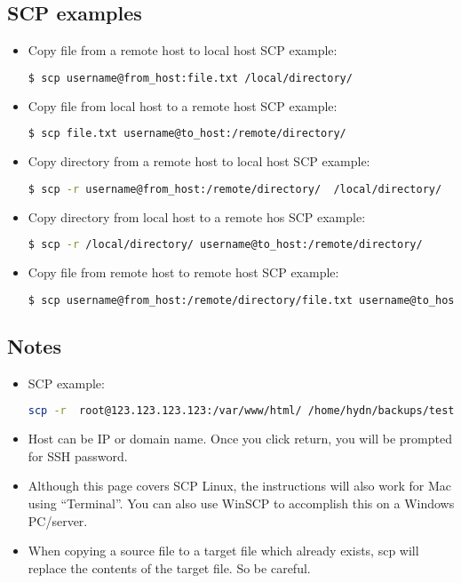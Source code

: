 \subsection{SCP examples} 
\begin{itemize}
\item Copy file from a remote host to local host SCP example:
\begin{lstlisting}[language=bash,numbers=none] 
$ scp username@from_host:file.txt /local/directory/
\end{lstlisting}
\item Copy file from local host to a remote host SCP example:
\begin{lstlisting}[language=bash,numbers=none] 
$ scp file.txt username@to_host:/remote/directory/
\end{lstlisting} 
\item Copy directory from a remote host to local host SCP example:
\begin{lstlisting}[language=bash,numbers=none] 
$ scp -r username@from_host:/remote/directory/  /local/directory/
\end{lstlisting}
\item Copy directory from local host to a remote hos SCP example:
\begin{lstlisting}[language=bash,numbers=none] 
$ scp -r /local/directory/ username@to_host:/remote/directory/
\end{lstlisting} 
\item Copy file from remote host to remote host SCP example:
\begin{lstlisting}[language=bash,numbers=none] 
$ scp username@from_host:/remote/directory/file.txt username@to_host:/remote/directory/
\end{lstlisting}
\end{itemize}
\subsection{Notes}
\begin{itemize}
\item SCP example:  
\begin{lstlisting}[language=bash,numbers=none] 
scp -r  root@123.123.123.123:/var/www/html/ /home/hydn/backups/test/ Also see: Backup solutions.
\end{lstlisting}
\item Host can be IP or domain name. Once you click return, you will be prompted for SSH password.
\item Although this page covers SCP Linux, the instructions will also work for Mac using ``Terminal''.
You can also use WinSCP to accomplish this on a Windows PC/server.
\item When copying a source file to a target file which already exists, scp will replace the contents of the target file. So be careful.
\end{itemize}
